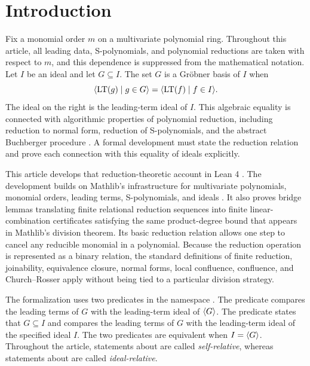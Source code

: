\section{Introduction}\label{sec:introduction}

Fix a monomial order $m$ on a multivariate polynomial ring.  Throughout
this article, all leading data, S-polynomials, and polynomial reductions are
taken with respect to $m$, and this dependence is suppressed from the
mathematical notation.  Let $I$ be an ideal and let $G\subseteq I$.  The set
$G$ is a Gr\"obner basis of $I$ when
\[
  \langle \operatorname{LT}(g)\mid g\in G \rangle
  =
  \langle \operatorname{LT}(f)\mid f\in I \rangle.
\]
The ideal on the right is the leading-term ideal of $I$.
This algebraic equality is connected with algorithmic properties of polynomial
reduction, including reduction to normal form, reduction of S-polynomials, and
the abstract Buchberger procedure
\citep{Buchberger2006,BeckerWeispfenning1993,CoxLittleOShea2025}.
A formal development must state the reduction relation and prove each
connection with this equality of ideals explicitly.

This article develops that reduction-theoretic account in Lean 4
\citep{deMouraUllrich2021}.  The development builds on Mathlib's
infrastructure for multivariate polynomials, monomial orders, leading terms,
S-polynomials, and ideals \citep{Mathlib2020}.  It also proves bridge lemmas translating finite relational reduction
sequences into finite linear-combination certificates satisfying the same
product-degree bound that appears in Mathlib's division theorem.  Its basic reduction relation allows one step to cancel any
reducible monomial in a polynomial.
Because the reduction operation is represented as a binary relation, the
standard definitions of finite reduction, joinability, equivalence closure,
normal forms, local confluence, confluence, and Church--Rosser apply without
being tied to a particular division strategy.

The formalization uses two predicates in the namespace
.  The predicate
compares the leading
terms of $G$ with the leading-term ideal of $\langle G \rangle$.  The predicate
states that $G\subseteq I$ and compares the leading
terms of $G$ with the leading-term ideal of the specified ideal $I$.  The two
predicates are equivalent when $I=\langle G \rangle$.  Throughout the article,
statements about  are called \emph{self-relative}, whereas
statements about  are called \emph{ideal-relative}.

